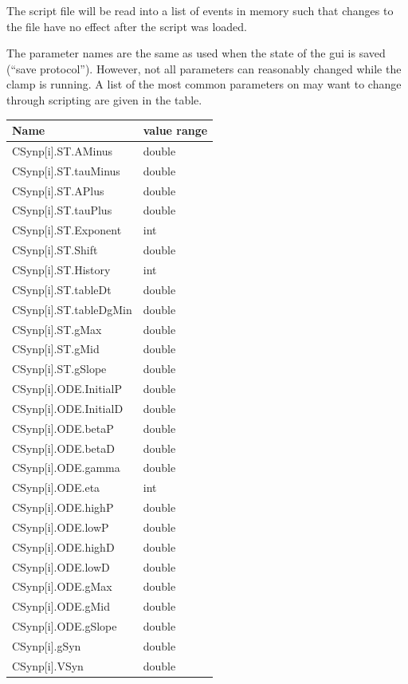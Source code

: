 \documentclass{article}
\begin{document}
The script file will be read into a list of events in memory such that
changes to the file have no effect after the script was loaded.

The parameter names are the same as used when the state of the gui is
saved (``save protocol''). However, not all parameters can reasonably
changed while the clamp is running. A list of the most common
parameters on may want to change through scripting are given in the table. \\
\begin{table}
\begin{tabular}[t]{|ll|}
\hline
{\bf Name} & {\bf value range} \\
\hline
CSynp[i].ST.AMinus & double \\
CSynp[i].ST.tauMinus & double \\
CSynp[i].ST.APlus & double \\
CSynp[i].ST.tauPlus & double \\
CSynp[i].ST.Exponent & int \\
CSynp[i].ST.Shift & double \\
CSynp[i].ST.History & int \\
CSynp[i].ST.tableDt & double \\
CSynp[i].ST.tableDgMin & double \\
CSynp[i].ST.gMax & double \\
CSynp[i].ST.gMid & double \\
CSynp[i].ST.gSlope & double \\
CSynp[i].ODE.InitialP & double \\
CSynp[i].ODE.InitialD & double \\
CSynp[i].ODE.betaP & double \\
CSynp[i].ODE.betaD & double \\
CSynp[i].ODE.gamma & double \\ 
CSynp[i].ODE.eta & int \\
CSynp[i].ODE.highP & double \\
CSynp[i].ODE.lowP & double \\
CSynp[i].ODE.highD & double \\
CSynp[i].ODE.lowD & double \\
CSynp[i].ODE.gMax & double \\
CSynp[i].ODE.gMid & double \\
CSynp[i].ODE.gSlope & double \\
CSynp[i].gSyn & double \\
CSynp[i].VSyn & double \\

\end{tabular}
\end{table}
\end{document}
